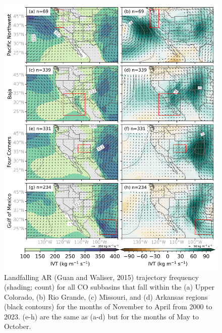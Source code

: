 \documentclass[jgrga]{agutexSI2019}
\begin{document}
\begin{article}
\begin{figure}
\noindent\includegraphics[scale=0.8]{figS11.png}
\caption{Landfalling AR (Guan and Waliser, 2015) trajectory frequency (shading; count) for all CO subbasins that fall within the (a) Upper Colorado, (b) Rio Grande, (c) Missouri, and (d) Arkansas regions (black contours) for the months of November to April from 2000 to 2023. (e-h) are the same as (a-d) but for the months of May to October.}
\label{fig:supp:heatmaps_GW}
\end{figure}
\clearpage


\end{article}
\end{document}

